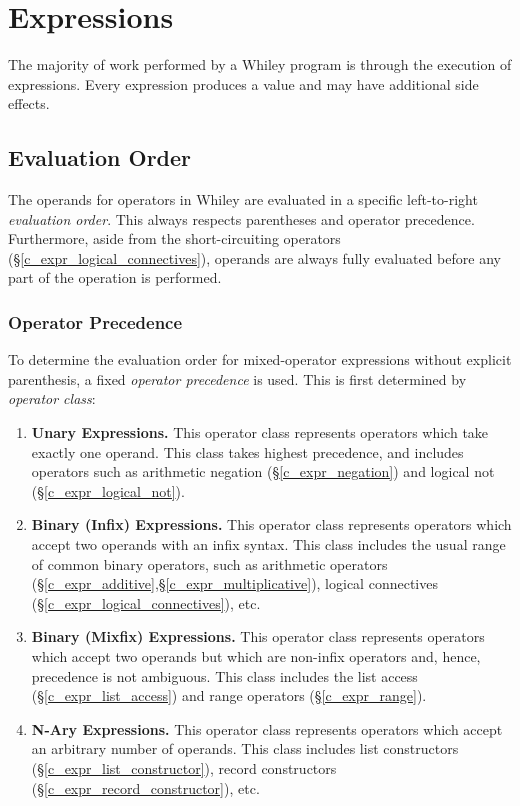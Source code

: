 
\chapter{Expressions}
The majority of work performed by a Whiley program is through the execution of \glspl{expression}.  Every expression produces a \gls{value} and may have additional side effects.

\section{Evaluation Order}

The operands for operators in Whiley are evaluated in a specific left-to-right {\em evaluation order}.  This always respects parentheses and operator precedence.  Furthermore, aside from the short-circuiting operators (\S\ref{c_expr_logical_connectives}), operands are always fully evaluated before any part of the operation is performed.

\subsection{Operator Precedence}

To determine the evaluation order for mixed-operator expressions without explicit parenthesis, a fixed {\em operator precedence} is used.  This is first determined by {\em operator class}:

\begin{enumerate}
\item {\bf Unary Expressions.} This operator class represents operators which take exactly one operand.  This class takes highest precedence, and includes operators such as arithmetic negation (\S\ref{c_expr_negation}) and logical not (\S\ref{c_expr_logical_not}).
\item {\bf Binary (Infix) Expressions.}  This operator class represents operators which accept two operands with an infix syntax.  This class includes the usual range of common binary operators, such as arithmetic operators (\S\ref{c_expr_additive},\S\ref{c_expr_multiplicative}), logical connectives (\S\ref{c_expr_logical_connectives}), etc.

\item {\bf Binary (Mixfix) Expressions.}  This operator class represents operators which accept two operands but which are non-infix operators and, hence, precedence is not ambiguous.  This class includes the list access (\S\ref{c_expr_list_access}) and range operators (\S\ref{c_expr_range}).
\item {\bf N-Ary Expressions.}  This operator class represents operators which accept an arbitrary number of operands.  This class includes list constructors (\S\ref{c_expr_list_constructor}), record constructors (\S\ref{c_expr_record_constructor}), etc.
\end{enumerate}

